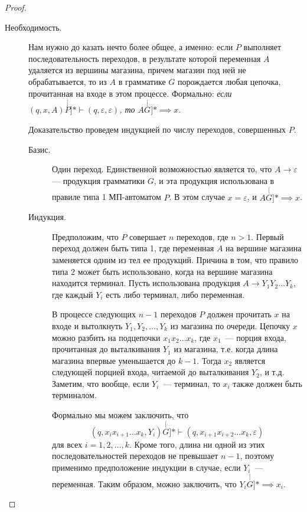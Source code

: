 \documentclass[a4paper,12pt]{article}
\begin{document}
\begin{proof}
\begin{description}
		\item[Необходимость.] Нам нужно до казать нечто более общее, а именно: если \(P\) выполняет последовательность переходов, в результате которой переменная \(A\) удаляется из вершины магазина, причем магазин под ней не обрабатывается, то из \(A\) в грамматике \(G\) порождается любая цепочка, прочитанная на входе в этом процессе. Формально: \emph{если \((q, x, A) \stackrel[P]{*}{\vdash} (q, \varepsilon, \varepsilon)\), то \(A \stackrel[G]{*}{\implies} x\)}.
		
		Доказательство проведем индукцией по числу переходов, совершенных \(P\).
		\begin{description}
			\item[Базис.] Один переход. Единственной возможностью является то, что \(A \to \varepsilon\) — продукция грамматики \(G\), и эта продукция использована в правиле типа 1 МП-автоматом \(P\).
			В этом случае \(x = \varepsilon\), и \(A \stackrel[G]{*}{\implies} x\).
			\item[Индукция.] Предположим, что \(P\) совершает \(n\) переходов, где \(n > 1\). Первый переход должен быть типа 1, где переменная \(A\) на вершине магазина заменяется одним из тел ее продукций. Причина в том, что правило типа 2 может быть использовано, когда на вершине магазина находится терминал. Пусть использована продукция \(A \to Y_1 Y_2 \ldots Y_k\), где каждый \(Y_i\) есть либо терминал, либо переменная.
			
			В процессе следующих \(n - 1\) переходов \(P\) должен прочитать \(x\) на входе и вытолкнуть \(Y_1, Y_2, \ldots, Y_k\) из магазина по очереди. Цепочку \(x\) можно разбить на подцепочки \(x_1 x_2 \ldots x_k\), где \(x_1\)~--- порция входа, прочитанная до выталкивания \(Y_1\) из магазина, т.е. когда длина магазина впервые уменьшается до \(k - 1\). Тогда \(x_2\) является следующей порцией входа, читаемой до выталкивания \(Y_2\), и т.д. Заметим, что вообще, если \(Y_i\)~--- терминал, то \(x_i\) также должен быть терминалом.
			
			Формально мы можем заключить, что \[(q, x_i x_{i + 1} \ldots x_k, Y_i) \stackrel[G]{*}{\vdash} (q, x_{i + 1} x_{i + 2} \ldots x_k, \varepsilon)\] для всех \(i = 1, 2, \ldots, k\). Кроме того, длина ни одной из этих последовательностей переходов не превышает \(n - 1\), поэтому применимо предположение индукции в случае, если \(Y_i\)~--- переменная. Таким образом, можно заключить, что \(Y_i \stackrel[G]{*}{\implies} x_i\).
			

\end{description}
\end{description}
\end{proof}
\end{document}
